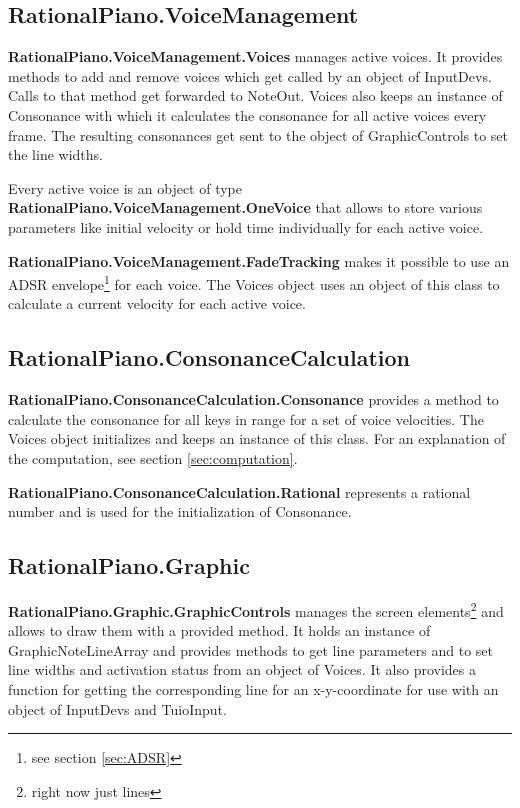 \documentclass[12pt,a4paper,titlepage,oneside]{report}
\begin{document}
\subsection{RationalPiano.VoiceManagement}

\textbf{RationalPiano.VoiceManagement.Voices} manages active voices. It provides methods to add and remove voices which get called by an object of InputDevs. Calls to that method get forwarded to NoteOut. Voices also keeps an instance of Consonance with which it calculates the consonance for all active voices every frame. The resulting consonances get sent to the object of GraphicControls to set the line widths.

Every active voice is an object of type \textbf{RationalPiano.VoiceManagement.OneVoice} that allows to store various parameters like initial velocity or hold time individually for each active voice. 

\textbf{RationalPiano.VoiceManagement.FadeTracking} makes it possible to use an ADSR envelope\footnote{see section \ref{sec:ADSR}} for each voice. The Voices object uses an object of this class to calculate a current velocity for each active voice.


\subsection{RationalPiano.ConsonanceCalculation}

\textbf{RationalPiano.ConsonanceCalculation.Consonance} provides a method to calculate the consonance for all keys in range for a set of voice velocities. The Voices object initializes and keeps an instance of this class. For an explanation of the computation, see section \ref{sec:computation}.

\textbf{RationalPiano.ConsonanceCalculation.Rational} represents a rational number and is used for the initialization of Consonance.


\subsection{RationalPiano.Graphic}

\textbf{RationalPiano.Graphic.GraphicControls} manages the screen elements\footnote{right now just lines} and allows to draw them with a provided method. It holds an instance of GraphicNoteLineArray and provides methods to get line parameters and to set line widths and activation status from an object of Voices. It also provides a function for getting the corresponding line for an x-y-coordinate for use with an object of InputDevs and TuioInput.
\end{document}
